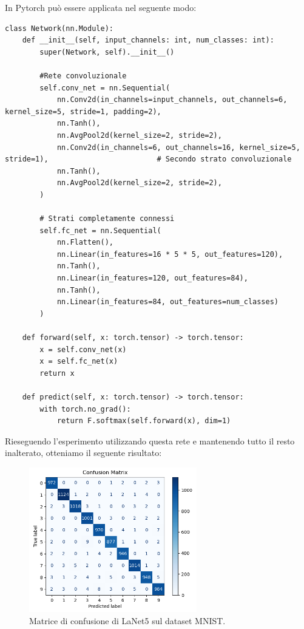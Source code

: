 In Pytorch può essere applicata nel seguente modo:
\begin{lstlisting}
class Network(nn.Module):
    def __init__(self, input_channels: int, num_classes: int):
        super(Network, self).__init__()
        
        #Rete convoluzionale
        self.conv_net = nn.Sequential(
            nn.Conv2d(in_channels=input_channels, out_channels=6, kernel_size=5, stride=1, padding=2),  
            nn.Tanh(),                                                         
            nn.AvgPool2d(kernel_size=2, stride=2),                             
            nn.Conv2d(in_channels=6, out_channels=16, kernel_size=5, stride=1),                         # Secondo strato convoluzionale
            nn.Tanh(),                                                         
            nn.AvgPool2d(kernel_size=2, stride=2),                            
        )
        
        # Strati completamente connessi
        self.fc_net = nn.Sequential(
            nn.Flatten(),                         
            nn.Linear(in_features=16 * 5 * 5, out_features=120),           
            nn.Tanh(),                            
            nn.Linear(in_features=120, out_features=84),                   
            nn.Tanh(),                            
            nn.Linear(in_features=84, out_features=num_classes)            
        )

    def forward(self, x: torch.tensor) -> torch.tensor:
        x = self.conv_net(x)
        x = self.fc_net(x)
        return x

    def predict(self, x: torch.tensor) -> torch.tensor:
        with torch.no_grad():
            return F.softmax(self.forward(x), dim=1)  

\end{lstlisting}
Rieseguendo l'esperimento utilizzando questa rete e mantenendo tutto il resto inalterato, 
otteniamo il seguente risultato:
\begin{figure}[H]
    \centering
    \includegraphics[width=0.65\textwidth]{Immagini/sperimentazione/confusion_matrix_LaNet5.png}
    \caption{Matrice di confusione di LaNet5 sul dataset MNIST.}
    \label{fig:LaNet5_confusionMatrix}
\end{figure}

